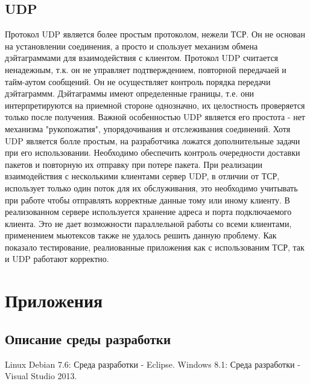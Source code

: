 \documentclass[12pt,a4paper]{report}
\begin{document}
\section{UDP}
Протокол UDP является более простым протоколом, нежели ТСР. Он не основан на установлении соединения, а просто и спользует механизм обмена дэйтаграммами для взаимодействия с клиентом.
\linebreak
Протокол UDP считается ненадежным, т.к. он не управляет подтверждением, повторной передачаей и тайм-аутом сообщений. Он не осуществляет контроль порядка передачи дэйтаграммм. Дэйтаграммы имеют определенные границы, т.е. они интерпретируются на приемной стороне однозначно, их целостность проверяется только после получения.
Важной особенностью UDP является его простота - нет механизма "рукопожатия", упорядочивания и отслеживания соединений.
Хотя UDP является болле простым, на разработчика ложатся дополнительные задачи при его использовании. Необходимо обеспечить контроль очередности доставки пакетов и повторную их отправку при потере пакета. При реализации взаимодействия с несколькими клиентами сервер UDP, в отличии от ТСР, использует только один поток для их обслуживания, это необходимо учитывать при работе чтобы отправлять корректные данные тому или иному клиенту. В реализованном сервере используется хранение адреса и порта подключаемого клиента. Это не дает возможности параллельной работы со всеми клиентами, применением мьютексов также не удалось решить данную проблему.
\linebreak
Как показало тестирование, реалиованные приложения как с использованим ТСР, так и UDP работают корректно.

\chapter{Приложения}
\section{Описание среды разработки}
Linux Debian 7.6: Среда разработки - Eclipse.\linebreak
Windows 8.1: Среда разработки - Visual Studio 2013.
\end{document}
